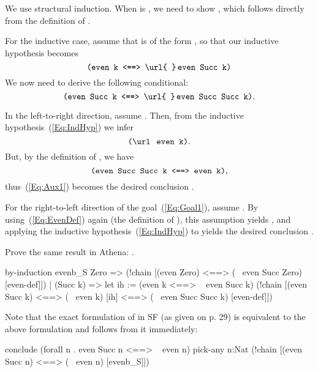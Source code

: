 \begin{solution}[print=true]
We use structural induction. When  is , we need to show , which follows
directly from the definition of . 

For the inductive case, assume that  is of the form , so that our inductive hypothesis becomes
\begin{equation}
\mtt{(even k <==> \url{~}$\ls$even Succ k)}
\label{Eq:IndHyp}
\end{equation}
We now need to derive the following conditional:
\begin{equation}
\mtt{(even Succ k <==> \url{~}$\ls$even Succ Succ k)}. 
\label{Eq:Goal1}
\end{equation}

In the left-to-right direction, assume . Then, from the inductive hypothesis~(\ref{Eq:IndHyp})
we infer 
\begin{equation}
\mtt{(\tneg even k)}.
\label{Eq:Aux1}
\end{equation}
But, by the definition of , we have 
\begin{equation}
\mtt{(even Succ Succ k <==> even k)},
\label{Eq:EvenDef}
\end{equation}
thus~(\ref{Eq:Aux1}) becomes the desired conclusion .

For the right-to-left direction of the goal~(\ref{Eq:Goal1}), assume . 
By using~(\ref{Eq:EvenDef}) again (the definition of ), this assumption yields 
, and applying the inductive hypothesis~(\ref{Eq:IndHyp}) to 
 yields the desired conclusion . 
\end{solution}
\begin{exercise}[subtitle={\mbox{\rm{\em (SF Exercise 1.0.3, p. 29)}}}]
Prove the same result in Athena: . 
\end{exercise}
\begin{solution}[print=true]
\begin{tcAthena}
  by-induction evenb_S {
    Zero => (!chain [(even Zero) 
                <==> (~ even Succ Zero)                   [even-def]])
  | (Succ k) => let {ih := (even k <==> ~ even Succ k)}
                  (!chain [(even Succ k)
                      <==> (~ even k)                     [ih]
                      <==> (~ even Succ Succ k)           [even-def]])
  }
\end{tcAthena}
Note that the exact formulation of  in SF (as given on p. 29) is equivalent to the above formulation
and follows from it immediately: 
\begin{tcAthena}
conclude (forall n . even Succ n <==> ~ even n) 
  pick-any n:Nat
    (!chain [(even Succ n) <==> (~ even n) [evenb_S]])
\end{tcAthena}
\end{solution}

